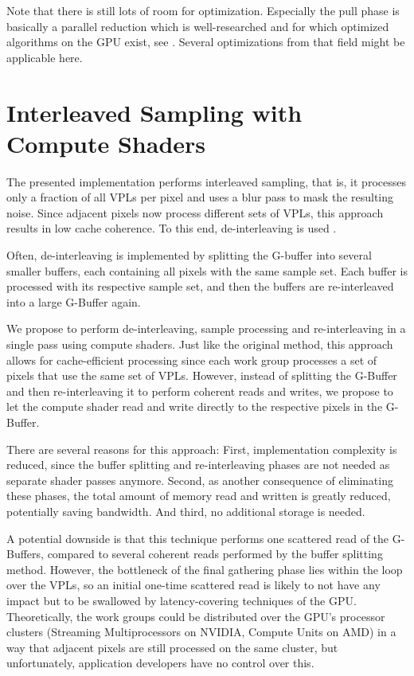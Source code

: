Note that there is still lots of room for optimization. Especially the pull phase is basically a parallel reduction which is well-researched and for which optimized algorithms on the GPU exist, see  \citet{Harris:2007:ParallelReduction}. Several optimizations from that field might be applicable here.



\section{Interleaved Sampling with Compute Shaders}
\label{sec:impl:interleavedShading}

The presented implementation performs interleaved sampling, that is, it processes only a fraction of all VPLs per pixel and uses a blur pass to mask the resulting noise. Since adjacent pixels now process different sets of VPLs, this approach results in low cache coherence. To this end, de-interleaving is used \citep{segovia2006non}.

Often, de-interleaving is implemented by splitting the G-buffer into several smaller buffers, each containing all pixels with the same sample set. Each buffer is processed with its respective sample set, and then the buffers are re-interleaved into a large G-Buffer again.

We propose to perform de-interleaving, sample processing and re-interleaving in a single pass using compute shaders. Just like the original method, this approach allows for cache-efficient processing since each work group processes a set of pixels that use the same set of VPLs. However, instead of splitting the G-Buffer and then re-interleaving it to perform coherent reads and writes, we propose to let the compute shader read and write directly to the respective pixels in the G-Buffer.

There are several reasons for this approach: First, implementation complexity is reduced, since the buffer splitting and re-interleaving phases are not needed as separate shader passes anymore. Second, as another consequence of eliminating these phases, the total amount of memory read and written is greatly reduced, potentially saving bandwidth. And third, no additional storage is needed.

A potential downside is that this technique performs one scattered read of the G-Buffers, compared to several coherent reads performed by the buffer splitting method. However, the bottleneck of the final gathering phase lies within the loop over the VPLs, so an initial one-time scattered read is likely to not have any impact but to be swallowed by latency-covering techniques of the GPU. Theoretically, the work groups could be distributed over the GPU's processor clusters (Streaming Multiprocessors on NVIDIA, Compute Units on AMD) in a way that adjacent pixels are still processed on the same cluster, but unfortunately, application developers have no control over this.

